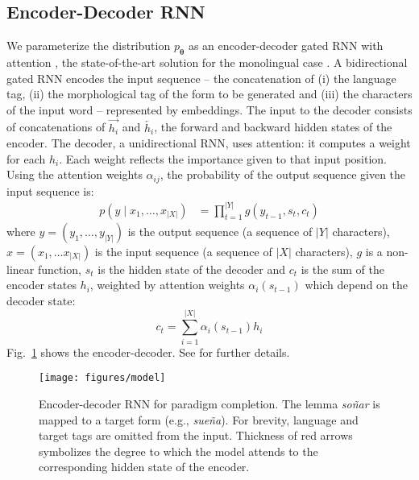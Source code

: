 \documentclass[11pt,letterpaper]{article}
\newcommand{\word}[1]{{\em #1}}
\newcommand{\ptheta}{p_{{\boldsymbol \theta}}}
\def\figref#1{Fig.~\ref{fig:#1}}
\begin{document}
\subsection{Encoder-Decoder RNN}
We parameterize the distribution $\ptheta$ as an encoder-decoder gated
RNN with attention \cite{bahdanau2014neural}, the state-of-the-art
solution for the monolingual case \cite{kann2016med}. 
A bidirectional gated RNN encodes the input
sequence \cite{cho2014properties} -- the concatenation of (i) the language tag, 
(ii) the morphological tag of the form to be generated and
(iii) the characters of the input word -- represented by
embeddings. 
The input to the decoder consists of concatenations of
$\overrightarrow{h_{i}}$ and
$\overleftarrow{h_{i}}$,
the forward and backward hidden states of the encoder.
The decoder, a unidirectional RNN,  uses
attention: it
computes a weight for each $h_i$.
Each weight reflects the importance given to that
input position.
Using the attention weights $\alpha_{ij}$, the probability of the output
sequence given the input sequence is:
\begin{align}
\label{eq:2}
  p(y \mid x_1,\ldots, x_{|X|}) 
       &= \prod_{t=1}^{|Y|}g(y_{t-1}, s_t, c_t)
\end{align}
where $y = (y_1, \ldots, y_{|Y|})$ 
is the output sequence (a sequence of $|Y|$ characters),
$x = (x_1, \ldots x_{|X|})$ is the input sequence (a sequence of $|X|$ characters), 
$g$ is a non-linear function, $s_t$ is the hidden state of
the decoder and $c_t$ is the sum of the encoder states $h_{i}$,
weighted by attention weights $\alpha_{i}(s_{t-1})$ which depend on the decoder state:
\begin{equation}
c_t = \sum_{i=1}^{|X|} \alpha_{i}(s_{t-1}) h_{i}
\end{equation}
\figref{model}
shows the encoder-decoder.  See
 for further details.

\begin{figure}
  \centering
  \texttt{[image: figures/model]}
  \caption{Encoder-decoder RNN
    for paradigm completion. The lemma \word{so\~{n}ar} is mapped to a
    target form (e.g., \word{sue\~{n}a}). For brevity, language and target
    tags are omitted from the input. 
Thickness of 
    red arrows symbolizes the degree to which the model
  attends to the corresponding hidden state of the encoder.}
  \label{fig:model}
\end{figure}
\end{document}
